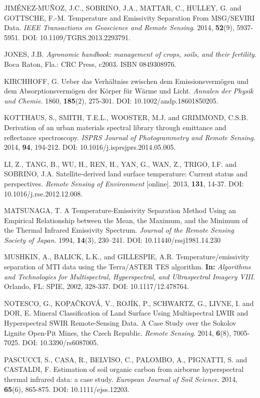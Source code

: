 \begin{thebibliography}{10}
 JIMÉNEZ-MUÑOZ, J.C., SOBRINO, J.A., MATTAR, C., HULLEY, G. and GOTTSCHE, F.-M. Temperature and Emissivity Separation From MSG/SEVIRI Data. \textit{IEEE Transactions on Geoscience and Remote Sensing}. 2014, \textbf{52}(9), 5937-5951. DOI: 10.1109/TGRS.2013.2293791. 

 JONES, J.B. \textit{Agronomic handbook: management of crops, soils, and their fertility}. Boca Raton, Fla.: CRC Press, c2003. ISBN 0849308976.

 KIRCHHOFF, G. Ueber das Verhältniss zwischen dem Emissionsvermögen und dem Absorptionsvermögen der Körper für Wärme und Licht. \textit{Annalen der Physik und Chemie}. 1860, \textbf{185}(2), 275-301. DOI: 10.1002/andp.18601850205.

 KOTTHAUS, S., SMITH, T.E.L., WOOSTER, M.J. and GRIMMOND, C.S.B. Derivation of an urban materials spectral library through emittance and reflectance spectroscopy. \textit{ISPRS Journal of Photogrammetry and Remote Sensing}. 2014, \textbf{94}, 194-212. DOI: 10.1016/j.isprsjprs.2014.05.005.

 LI, Z., TANG, B., WU, H., REN, H., YAN, G., WAN, Z., TRIGO, I.F. and SOBRINO, J.A. Satellite-derived land surface temperature: Current status and perspectives. \textit{Remote Sensing of Environment} [online]. 2013, \textbf{131}, 14-37. DOI: 10.1016/j.rse.2012.12.008.

 MATSUNAGA, T. A Temperature-Emissivity Separation Method Using an Empirical Relationship between the Mean, the Maximum, and the Minimum of the Thermal Infrared Emissivity Spectrum. \textit{Journal of the Remote Sensing Society of Japan}. 1994, \textbf{14}(3), 230–241. DOI: 10.11440/rssj1981.14.230

 MUSHKIN, A., BALICK, L.K., and GILLESPIE, A.R. Temperature/emissivity separation of MTI data using the Terra/ASTER TES algorithm. \textbf{In:} \textit{Algorithms and Technologies for Multispectral, Hyperspectral, and Ultraspectral Imagery VIII}. Orlando, FL: SPIE, 2002, 328-337. DOI: 10.1117/12.478764.

 NOTESCO, G., KOPAČKOVÁ, V., ROJÍK, P., SCHWARTZ, G., LIVNE, I. and DOR, E. Mineral Classification of Land Surface Using Multispectral LWIR and Hyperspectral SWIR Remote-Sensing Data. A Case Study over the Sokolov Lignite Open-Pit Mines, the Czech Republic. \textit{Remote Sensing}. 2014, \textbf{6}(8), 7005-7025. DOI: 10.3390/rs6087005.

 PASCUCCI, S., CASA, R., BELVISO, C., PALOMBO, A., PIGNATTI, S. and CASTALDI, F. Estimation of soil organic carbon from airborne hyperspectral thermal infrared data: a case study. \textit{European Journal of Soil Science}. 2014, \textbf{65}(6), 865-875. DOI: 10.1111/ejss.12203.


\end{thebibliography}
